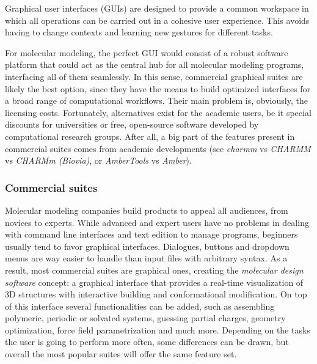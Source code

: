 Graphical user interfaces (GUIs) are designed to provide a common workspace in which all  operations can be carried out in a cohesive user experience. This avoids having to change contexts and learning new gestures for different tasks.

For molecular modeling, the perfect GUI would consist of a robust software platform that could act as the central hub for all molecular modeling programs, interfacing all of them seamlessly. In this sense, commercial graphical suites are likely the best option, since they have the means to build optimized interfaces for a broad range of computational workflows. Their main problem is, obviously, the licensing costs. Fortunately, alternatives exist for the academic users, be it special discounts for universities or free, open-source software developed by computational research groups. After all, a big part of the features present in commercial suites comes from academic developments (see \textit{charmm} vs \textit{CHARMM} vs \textit{CHARMm (Biovia)}, or \textit{AmberTools} vs \textit{Amber}).

\subsubsection{Commercial suites}
Molecular modeling companies build products to appeal all audiences, from novices to experts. While advanced and expert users have no problems in dealing with command line interfaces and text edition to manage programs, beginners usually tend to favor graphical interfaces. Dialogues, buttons and dropdown menus are way easier to handle than input files with arbitrary syntax. As a result, most commercial suites are graphical ones, creating the \textit{molecular design software} concept: a graphical interface that provides a real-time visualization of 3D structures with interactive building and conformational modification. On top of this interface several functionalities can be added, such as assembling polymeric, periodic or solvated systems, guessing partial charges, geometry optimization, force field parametrization and much more. Depending on the tasks the user is going to perform more often, some differences can be drawn, but overall the most popular suites will offer the same feature set.

